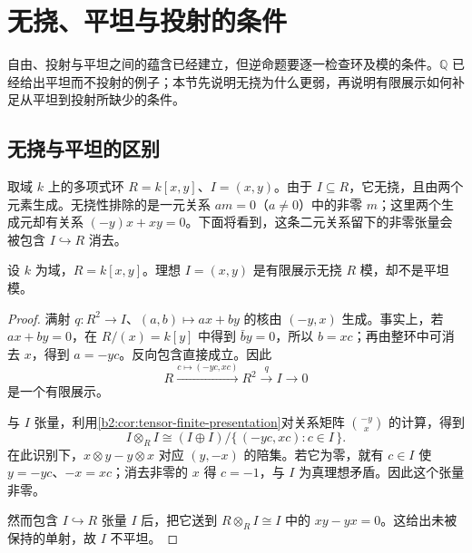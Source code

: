 
\section{无挠、平坦与投射的条件}
\label{b2:sec:0704}

自由、投射与平坦之间的蕴含已经建立，但逆命题要逐一检查环及模的条件。\(\mathbb Q\) 已经给出平坦而不投射的例子；本节先说明无挠为什么更弱，再说明有限展示如何补足从平坦到投射所缺少的条件。

%
%
%

\subsection{无挠与平坦的区别}
\label{b2:subsec:0704:01}

取域 \(k\) 上的多项式环 \(R=k[x,y]\)、\(I=(x,y)\)。由于 \(I\subseteq R\)，它无挠，且由两个元素生成。无挠性排除的是一元关系 \(am=0\)（\(a\ne0\)）中的非零 \(m\)；这里两个生成元却有关系 \((-y)x+xy=0\)。下面将看到，这条二元关系留下的非零张量会被包含 \(I\hookrightarrow R\) 消去。

\begin{example}\label{b2:exm:torsionfree-not-flat}
	设 \(k\) 为域，\(R=k[x,y]\)。理想 \(I=(x,y)\) 是有限展示无挠 \(R\) 模，却不是平坦模。
\end{example}
\begin{proof}
	满射 \(q:R^2\to I\)、\((a,b)\mapsto ax+by\) 的核由 \((-y,x)\) 生成。事实上，若 \(ax+by=0\)，在 \(R/(x)=k[y]\) 中得到 \(\bar b y=0\)，所以 \(b=xc\)；再由整环中可消去 \(x\)，得到 \(a=-yc\)。反向包含直接成立。因此
	\[
		R\xrightarrow{c\mapsto(-yc,xc)}R^2\xrightarrow{q}I\longrightarrow0
	\]
	是一个有限展示。

	与 \(I\) 张量，利用\cref{b2:cor:tensor-finite-presentation}对关系矩阵 \(\binom{-y}{x}\) 的计算，得到
	\[
		I\otimes_R I\cong (I\oplus I)/\bigl\{\,(-yc,xc):c\in I\,\bigr\}.
	\]
	在此识别下，\(x\otimes y-y\otimes x\) 对应 \((y,-x)\) 的陪集。若它为零，就有 \(c\in I\) 使 \(y=-yc\)、\(-x=xc\)；消去非零的 \(x\) 得 \(c=-1\)，与 \(I\) 为真理想矛盾。因此这个张量非零。

	然而包含 \(I\hookrightarrow R\) 张量 \(I\) 后，把它送到 \(R\otimes_R I\cong I\) 中的 \(xy-yx=0\)。这给出未被保持的单射，故 \(I\) 不平坦。
\end{proof}

